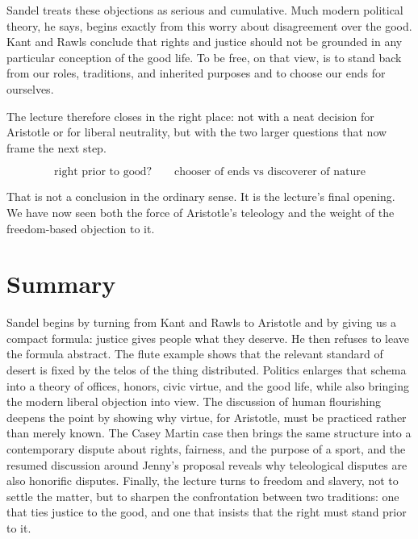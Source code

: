 Sandel treats these objections as serious and cumulative. Much modern political theory, he says, begins exactly from this worry about disagreement over the good. Kant and Rawls conclude that rights and justice should not be grounded in any particular conception of the good life. To be free, on that view, is to stand back from our roles, traditions, and inherited purposes and to choose our ends for ourselves.

The lecture therefore closes in the right place: not with a neat decision for Aristotle or for liberal neutrality, but with the two larger questions that now frame the next step.

\begin{equation}
\text{right prior to good?}
\qquad
\text{chooser of ends vs discoverer of nature}
\end{equation}

That is not a conclusion in the ordinary sense. It is the lecture's final opening. We have now seen both the force of Aristotle's teleology and the weight of the freedom-based objection to it.

\section{Summary}

Sandel begins by turning from Kant and Rawls to Aristotle and by giving us a compact formula: justice gives people what they deserve. He then refuses to leave the formula abstract. The flute example shows that the relevant standard of desert is fixed by the telos of the thing distributed. Politics enlarges that schema into a theory of offices, honors, civic virtue, and the good life, while also bringing the modern liberal objection into view. The discussion of human flourishing deepens the point by showing why virtue, for Aristotle, must be practiced rather than merely known. The Casey Martin case then brings the same structure into a contemporary dispute about rights, fairness, and the purpose of a sport, and the resumed discussion around Jenny's proposal reveals why teleological disputes are also honorific disputes. Finally, the lecture turns to freedom and slavery, not to settle the matter, but to sharpen the confrontation between two traditions: one that ties justice to the good, and one that insists that the right must stand prior to it.